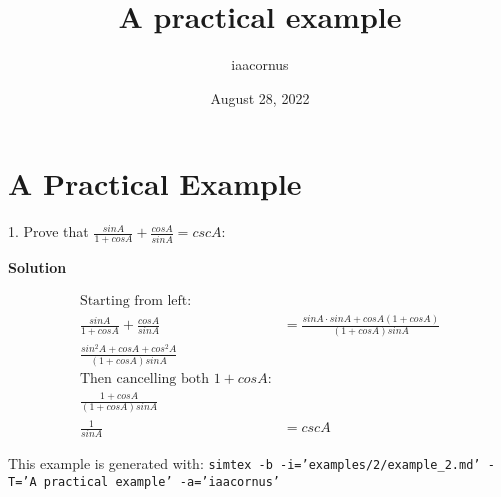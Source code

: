 \documentclass[12pt, UTF8]{article}
\title{A practical example}
\author{iaacornus}
\date{August 28, 2022}
\begin{document}
	\maketitle
	\section{A Practical Example}
	
	1. Prove that $\frac{sin A}{1 + cos A} + \frac{cos A}{sin A} = csc A$:
	
	\textbf{Solution}
	
	\begin{align}
		\text{Starting from left:}\\
		\frac{sin A}{1 + cos A} + \frac{cos A}{sin A} &= \frac{sin A \cdot sin A + cos A (1 + cos A)}{(1 + cos A) sin A}\\
		\frac{sin^2 A + cos A + cos^2 A}{(1 + cos A) sin A}\\
		\text{Then cancelling both $1 + cos A$:}\\
		\frac{1 + cos A}{(1 + cos A) sin A}\\
		\frac{1}{sin A} &= csc A
	\end{align}
	
	This example is generated with: \texttt{simtex -b -i='examples/2/example\_2.md'  -T='A practical example' -a='iaacornus'}
\end{document}
